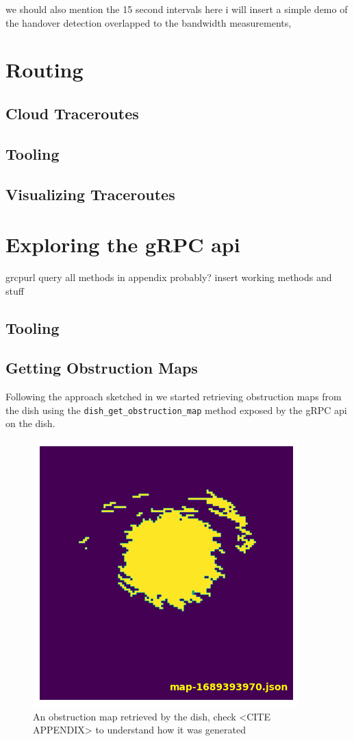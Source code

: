 \documentclass[IN,11pt,twoside,openright,bachelor,english]{tumthesis}
\begin{document}
we should also mention the 15 second intervals
here i will insert a simple demo of the handover detection overlapped to the bandwidth measurements, 



\chapter{Routing}
\section{Cloud Traceroutes}
\section{Tooling}
\section{Visualizing Traceroutes}


\chapter{Exploring the gRPC api}

grcpurl
query all methods
in appendix probably? insert working methods and stuff


\section{Tooling}
\section{Getting Obstruction Maps}
Following the approach sketched in \cite{izhikevich2023democratizing} we started retrieving obstruction maps from the dish using the \texttt{dish\_get\_obstruction\_map} method exposed by the gRPC api on the dish.



\begin{figure}	
	\centering
	\includegraphics[]{img/obstruction_map_finale.png}
	\caption{An obstruction map retrieved by the dish, check <CITE APPENDIX> to understand how it was generated}
\end{figure}
\end{document}
